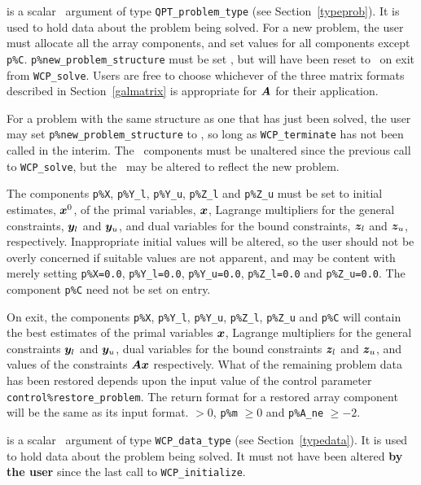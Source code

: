 \documentclass{galahad}
\newcommand{\packagename}{WCP}
\begin{document}
\vspace*{-3mm}
\begin{description}
 is a scalar \intentinout\ argument of type 
{\tt QPT\_problem\_type}
(see Section~\ref{typeprob}). 
It is used to hold data about the problem being solved.
For a new problem, the user must allocate all the array components,
and set values for all components except {\tt p\%C}.
{\tt p\%new\_problem\_structure} must be set \true, but will have been reset
to \false\ on exit from {\tt \packagename\_solve}.
Users are free to choose whichever
of the three matrix formats described in Section~\ref{galmatrix} 
is appropriate for ${\bm{A}}$ for their application.

For a problem with the same structure as one that has just been 
solved, the user may set {\tt p\%new\_problem\_str\-u\-cture} to \false,
so long as {\tt \packagename\_terminate} has not been called in the interim.
The \integer\ components must be unaltered since the
previous call to {\tt \packagename\_solve}, but the \realdp\ 
may be altered to reflect the new problem.

The components {\tt p\%X}, {\tt p\%Y\_l}, {\tt p\%Y\_u}, {\tt p\%Z\_l} 
and {\tt p\%Z\_u}
must be set to initial estimates, ${\bm{x}}^{0}$, of the primal variables, 
${\bm{x}}$, Lagrange multipliers for the general constraints, ${\bm{y}}_l$ and ${\bm{y}}_u$, 
and dual variables for the bound constraints, ${\bm{z}}_l$ and ${\bm{z}}_u$, 
respectively.
Inappropriate initial values will be altered, so the user should
not be overly concerned if suitable values are not apparent, and may be
content with merely setting {\tt p\%X=0.0},
{\tt p\%Y\_l=0.0}, {\tt p\%Y\_u=0.0}, {\tt p\%Z\_l=0.0} 
and 
{\tt p\%Z\_u=0.0}.
The component {\tt p\%C} need not be set on entry.

On exit, the components {\tt p\%X},
{\tt p\%Y\_l}, {\tt p\%Y\_u}, {\tt p\%Z\_l}, {\tt p\%Z\_u} and {\tt p\%C}
will contain the best estimates of the primal variables ${\bm{x}}$, 
Lagrange multipliers for the general
constraints ${\bm{y}}_l$ and ${\bm{y}}_u$, 
dual variables for the bound constraints ${\bm{z}}_l$ and ${\bm{z}}_u$, 
and values of the constraints ${\bm{A}} {\bm{x}}$ respectively.
What of the remaining problem data has been restored depends upon
the input value of the control parameter {\tt control\%restore\_problem}.
The return format for a restored array component will be the same as its
input format.
 $> 0$, {\tt p\%m} $\geq 0$ and {\tt p\%A\_ne} 
              $\geq -2$.

 is a scalar \intentinout\ argument of type 
{\tt \packagename\_data\_type}
(see Section~\ref{typedata}). It is used to hold data about the problem being 
solved. It must not have been altered {\bf by the user} since the last call to 
{\tt \packagename\_initialize}.


\end{description}
\end{document}
